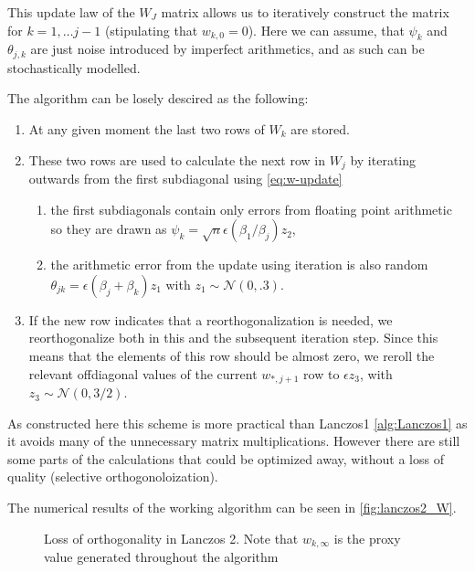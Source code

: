 \documentclass{article}
\begin{document}
	 This update law of the $W_J$ matrix allows us to iteratively construct the matrix for $k=1,\dots j-1$ (stipulating that $w_{k,0} = 0$). Here we can assume, that $\psi_k$ and $\theta_{j,k}$ are just noise introduced by imperfect arithmetics, and as such can be stochastically modelled.
	 
	 The algorithm can be losely descired as the following:
	 \begin{enumerate}
	 	\item At any given moment the last two rows of $W_k$ are stored.
	 	\item These two rows are used to calculate the next row in $W_j$ by iterating outwards from the first subdiagonal using \autoref{eq:w-update}
	 	\begin{enumerate}
	 		\item the first subdiagonals contain only errors from floating point arithmetic so they are drawn as $\psi_{k}=\sqrt{n}\epsilon(\beta_{1}/\beta_{j}) z_2$,
	 		\item the arithmetic error from the update using iteration is also random $\theta_{jk}=\epsilon(\beta_{j}+\beta_{k})z_1$ with $z_1\sim \mathcal{N}(0,.3)$.
	 	\end{enumerate}
	 	\item If the new row indicates that a reorthogonalization is needed, we reorthogonalize both in this and the subsequent iteration step. Since this means that the elements of this row should be almost zero, we reroll the relevant offdiagonal values of the current $w_{*,j+1}$ row to $\epsilon z_3$, with $z_3\sim\mathcal{N}(0,3/2)$.
	 \end{enumerate}
	 
	 As constructed here this scheme is more practical than Lanczos1 \autoref{alg:Lanczos1} as it avoids many of the unnecessary matrix multiplications. However there are still some parts of the calculations that could be optimized away, without a loss of quality (selective orthogonoloization). 
	 
	 The numerical results of the working algorithm can be seen in \autoref{fig:lanczos2_W}.
	 
	 \begin{figure}
	 	\centering
	 	\resizebox{\textwidth}{!}{
	 		}
	 	\caption{Loss of orthogonality in Lanczos 2. Note that $w_{k,\infty}$ is the proxy value generated throughout the algorithm}\label{fig:lanczos2_W}
	 \end{figure}
\end{document}
